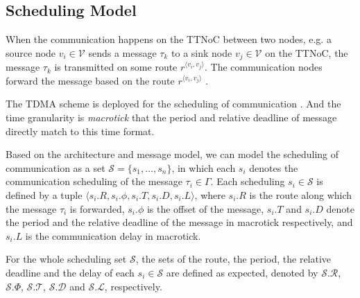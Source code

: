 \documentclass[journal]{IEEEtran}
\newcommand{\calV}{\mathcal{V}}
\newcommand{\calL}{\mathcal{L}}
\newcommand{\calS}{\mathcal{S}}
\newcommand{\calR}{\mathcal{R}}
\newcommand{\calD}{\mathcal{D}}
\newcommand{\calT}{\mathcal{T}}
\newcommand{\route}[3]{#1^{\langle #2,#3\rangle}}
\theoremstyle{remark}
\begin{document}
\subsection{Scheduling Model}
\label{ss:schmodel}

When the communication happens on the TTNoC between two nodes,
 e.g. a source node $v_i\in \calV$ sends a message $\tau_{k}$ to a sink node $v_j\in \calV$ on the TTNoC,
  the message $\tau_k$ is transmitted on some route $\route{r}{v_i}{v_j}$. 
The communication nodes forward the message based on the route $\route{r}{v_i}{v_j}$ .

The TDMA scheme is deployed for the scheduling of communication .  
And the time granularity is \emph{macrotick} that the period and relative deadline of message directly match to this time format.

Based on the architecture and message model,
 we can model the scheduling of communication as a set $\calS=\{s_1,\ldots,s_n\}$,
  in which each $s_{i}$ denotes the communication scheduling of the message $\tau_{i}\in\Gamma$. 
Each scheduling $s_{i}\in\calS$ is defined by a tuple $\langle s_i.R, s_i.\phi, s_i.T, s_i.D, s_i.L\rangle$,
 where $s_i.R$ is the route along which the message $\tau_i$ is forwarded, 
 $s_i.\phi$ is the offset of the message,
  $s_i.T$ and
   $s_i.D$ denote the period and the relative deadline of the message in macrotick respectively,
    and $s_i.L$ is the communication delay in macrotick.

For the whole scheduling set $\calS$,
 the sets of the route,
  the period,
   the relative deadline and the delay of each $s_i\in\calS$ are defined as expected,
 denoted by $\calS.\calR$,
  $\calS.\Phi$,
   $\calS.\calT$,
    $\calS.\calD$ and $\calS.\calL$,
     respectively.

\end{document}
